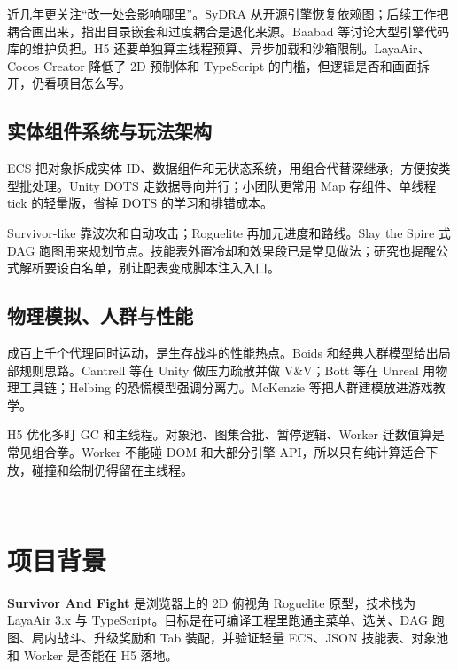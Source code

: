 \documentclass[UTF8,a4paper]{ctexart}
\begin{document}
近几年更关注“改一处会影响哪里”。SyDRA 从开源引擎恢复依赖图\cite{ullmann2025sydra}；后续工作把耦合画出来，指出目录嵌套和过度耦合是退化来源\cite{ullmann2023coupling}。Baabad 等讨论大型引擎代码库的维护负担\cite{baabad2020degradation}。H5 还要单独算主线程预算、异步加载和沙箱限制。LayaAir、Cocos Creator 降低了 2D 预制体和 TypeScript 的门槛，但逻辑是否和画面拆开，仍看项目怎么写\cite{gregory2018game,ullmann2023coupling}。

\subsection{实体组件系统与玩法架构}

ECS 把对象拆成实体 ID、数据组件和无状态系统，用组合代替深继承，方便按类型批处理\cite{gregory2018game}。Unity DOTS 走数据导向并行；小团队更常用 Map 存组件、单线程 tick 的轻量版，省掉 DOTS 的学习和排错成本。

Survivor-like 靠波次和自动攻击；Roguelite 再加元进度和路线。Slay the Spire 式 DAG 跑图用来规划节点\cite{gregory2018game}。技能表外置冷却和效果段已是常见做法；研究也提醒公式解析要设白名单，别让配表变成脚本注入入口\cite{gregory2018game,petty2010vv}。

\subsection{物理模拟、人群与性能}

成百上千个代理同时运动，是生存战斗的性能热点。Boids 和经典人群模型给出局部规则思路\cite{reynolds1987flocks,thalmann2007crowd,pelechano2008virtual}。Cantrell 等在 Unity 做压力疏散并做 V\&V\cite{cantrell2018unity}；Bott 等在 Unreal 用物理工具链\cite{bott2014unreal}；Helbing 的恐慌模型强调分离力\cite{helbing2000panic}。McKenzie 等把人群建模放进游戏教学\cite{mckenzie2008crowd}。

H5 优化多盯 GC 和主线程。对象池、图集合批、暂停逻辑、Worker 迁数值算是常见组合拳\cite{gregory2018game,mckenzie2008crowd}。Worker 不能碰 DOM 和大部分引擎 API，所以只有纯计算适合下放，碰撞和绘制仍得留在主线程。

﻿
\section{项目背景}

\textbf{Survivor And Fight} 是浏览器上的 2D 俯视角 Roguelite 原型，技术栈为 LayaAir 3.x 与 TypeScript。目标是在可编译工程里跑通主菜单、选关、DAG 跑图、局内战斗、升级奖励和 Tab 装配，并验证轻量 ECS、JSON 技能表、对象池和 Worker 是否能在 H5 落地。
\end{document}

